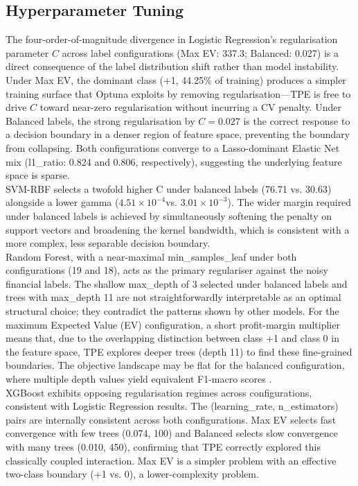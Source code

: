 \subsection{Hyperparameter Tuning}
The four-order-of-magnitude divergence in Logistic Regression's regularisation parameter $C$ across label configurations (Max EV: 337.3; Balanced: 0.027) is a direct consequence of the label distribution shift rather than model instability. Under Max EV, the dominant class (+1, 44.25\% of training) produces a simpler training surface that Optuna exploits by removing regularisation—TPE is free to drive $C$ toward near-zero regularisation without incurring a CV penalty. Under Balanced labels, the strong regularisation by $C=0.027$ is the correct response to a decision boundary in a denser region of feature space, preventing the boundary from collapsing. Both configurations converge to a Lasso-dominant Elastic Net mix (l1\_ratio: 0.824 and 0.806, respectively), suggesting the underlying feature space is sparse. \\
SVM-RBF selects a twofold higher C under balanced labels (76.71 vs. 30.63) alongside a lower gamma ($4.51\times10^{-4}$vs. $3.01\times10^{-3}$). The wider margin required under balanced labels is achieved by simultaneously softening the penalty on support vectors and broadening the kernel bandwidth, which is consistent with a more complex, less separable decision boundary. \\
Random Forest, with a near-maximal min\_samples\_leaf under both configurations (19 and 18), acts as the primary regulariser against the noisy financial labels. The shallow max\_depth of 3 selected under balanced labels and trees with max\_depth 11 are not straightforwardly interpretable as an optimal structural choice; they contradict the patterns shown by other models. For the maximum Expected Value (EV) configuration, a short profit-margin multiplier means that, due to the overlapping distinction between class +1 and class 0 in the feature space, TPE explores deeper trees (depth 11) to find these fine-grained boundaries. The objective landscape may be flat for the balanced configuration, where multiple depth values yield equivalent F1-macro scores \cite{watanabeTreeStructuredParzenEstimator2023}.\\
XGBoost exhibits opposing regularisation regimes across configurations, consistent with Logistic Regression results. The (learning\_rate, n\_estimators) pairs are internally consistent across both configurations. Max EV selects fast convergence with few trees (0.074, 100) and Balanced selects slow convergence with many trees (0.010, 450), confirming that TPE correctly explored this classically coupled interaction. Max EV is a simpler problem with an effective two-class boundary (+1 vs. 0), a lower-complexity problem.
